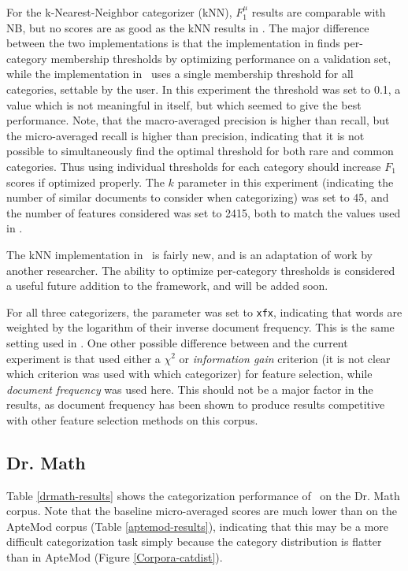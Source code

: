 For the k-Nearest-Neighbor categorizer (kNN), $F_1^\mu$ results are comparable
with NB, but no scores are as good as the kNN results in \cite{yang:99}.
The major difference between the two implementations is that the
implementation in \cite{yang:99} finds per-category membership
thresholds by optimizing performance on a validation set, while the
implementation in \aicat\ uses a single membership threshold for all
categories, settable by the user.  In this experiment the threshold
was set to 0.1, a value which is not meaningful in itself, but which
seemed to give the best performance.  Note, that the macro-averaged
precision is higher than recall, but the micro-averaged recall is
higher than precision, indicating that it is not possible to
simultaneously find the optimal threshold for both rare and common
categories.  Thus using individual thresholds for each category should
increase $F_1$ scores if optimized properly.  The $k$ parameter
in this experiment
(indicating the number of similar documents to consider when
categorizing) was set to 45, and the number of features considered was
set to 2415, both to match the values used in \cite{yang:99}.

The kNN implementation in \aicat\ is fairly new, and is an adaptation
of work by another researcher.  The ability to optimize per-category
thresholds is considered a useful future addition to the framework,
and will be added soon.

For all three categorizers, the  parameter was set to
\texttt{xfx}, indicating that words are weighted by the logarithm of
their inverse document frequency.  This is the same setting used in
\cite{yang:99}.  One other possible difference between \cite{yang:99}
and the current experiment is that \cite{yang:99} used either a
$\chi^2$ or \emph{information gain} criterion (it is not clear which
criterion was used with which categorizer) for feature selection,
while \emph{document frequency} was used here.  This should not be a
major factor in the results, as document frequency has been shown to
produce results competitive with other feature selection methods on
this corpus. \cite{yang:97}



\subsection{Dr. Math}

Table \ref{drmath-results} shows the categorization performance of
\aicat\ on the Dr. Math corpus.  Note that the baseline micro-averaged
scores are much lower than on the ApteMod corpus (Table
\ref{aptemod-results}), indicating that this may be a more difficult
categorization task simply because the category distribution is
flatter than in ApteMod (Figure \ref{Corpora-catdist}).


